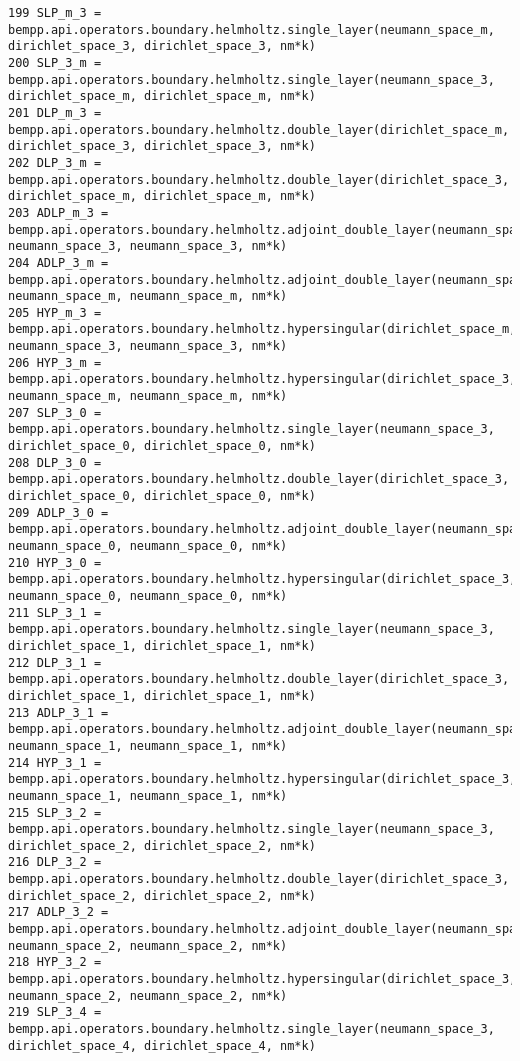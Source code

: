 \documentclass[12pt,letterpaper]{article}
\numberwithin{equation}{section}
\begin{document}
\begin{lstlisting}
199 SLP_m_3 = bempp.api.operators.boundary.helmholtz.single_layer(neumann_space_m, dirichlet_space_3, dirichlet_space_3, nm*k)
200 SLP_3_m = bempp.api.operators.boundary.helmholtz.single_layer(neumann_space_3, dirichlet_space_m, dirichlet_space_m, nm*k)
201 DLP_m_3 = bempp.api.operators.boundary.helmholtz.double_layer(dirichlet_space_m, dirichlet_space_3, dirichlet_space_3, nm*k)
202 DLP_3_m = bempp.api.operators.boundary.helmholtz.double_layer(dirichlet_space_3, dirichlet_space_m, dirichlet_space_m, nm*k)
203 ADLP_m_3 = bempp.api.operators.boundary.helmholtz.adjoint_double_layer(neumann_space_m, neumann_space_3, neumann_space_3, nm*k)
204 ADLP_3_m = bempp.api.operators.boundary.helmholtz.adjoint_double_layer(neumann_space_3, neumann_space_m, neumann_space_m, nm*k)
205 HYP_m_3 = bempp.api.operators.boundary.helmholtz.hypersingular(dirichlet_space_m, neumann_space_3, neumann_space_3, nm*k)
206 HYP_3_m = bempp.api.operators.boundary.helmholtz.hypersingular(dirichlet_space_3, neumann_space_m, neumann_space_m, nm*k)
207 SLP_3_0 = bempp.api.operators.boundary.helmholtz.single_layer(neumann_space_3, dirichlet_space_0, dirichlet_space_0, nm*k)
208 DLP_3_0 = bempp.api.operators.boundary.helmholtz.double_layer(dirichlet_space_3, dirichlet_space_0, dirichlet_space_0, nm*k)
209 ADLP_3_0 = bempp.api.operators.boundary.helmholtz.adjoint_double_layer(neumann_space_3, neumann_space_0, neumann_space_0, nm*k)
210 HYP_3_0 = bempp.api.operators.boundary.helmholtz.hypersingular(dirichlet_space_3, neumann_space_0, neumann_space_0, nm*k)
211 SLP_3_1 = bempp.api.operators.boundary.helmholtz.single_layer(neumann_space_3, dirichlet_space_1, dirichlet_space_1, nm*k)
212 DLP_3_1 = bempp.api.operators.boundary.helmholtz.double_layer(dirichlet_space_3, dirichlet_space_1, dirichlet_space_1, nm*k)
213 ADLP_3_1 = bempp.api.operators.boundary.helmholtz.adjoint_double_layer(neumann_space_3, neumann_space_1, neumann_space_1, nm*k)
214 HYP_3_1 = bempp.api.operators.boundary.helmholtz.hypersingular(dirichlet_space_3, neumann_space_1, neumann_space_1, nm*k)
215 SLP_3_2 = bempp.api.operators.boundary.helmholtz.single_layer(neumann_space_3, dirichlet_space_2, dirichlet_space_2, nm*k)
216 DLP_3_2 = bempp.api.operators.boundary.helmholtz.double_layer(dirichlet_space_3, dirichlet_space_2, dirichlet_space_2, nm*k)
217 ADLP_3_2 = bempp.api.operators.boundary.helmholtz.adjoint_double_layer(neumann_space_3, neumann_space_2, neumann_space_2, nm*k)
218 HYP_3_2 = bempp.api.operators.boundary.helmholtz.hypersingular(dirichlet_space_3, neumann_space_2, neumann_space_2, nm*k)
219 SLP_3_4 = bempp.api.operators.boundary.helmholtz.single_layer(neumann_space_3, dirichlet_space_4, dirichlet_space_4, nm*k)

\end{lstlisting}
\end{document}
